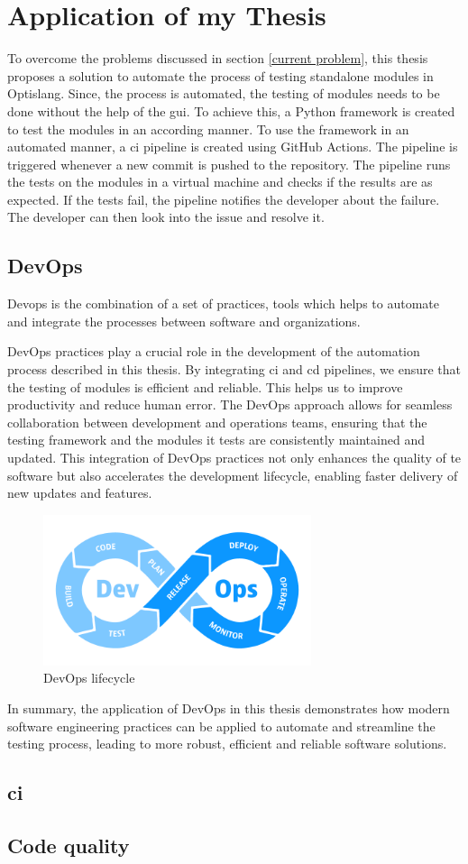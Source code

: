 \chapter{Application of my Thesis}

To overcome the problems discussed in section \ref{current problem}, this thesis proposes a solution to automate the process of testing standalone modules
in Optislang. Since, the process is automated, the testing of modules needs to be done without the help of the \acrshort{gui}. To achieve this, a Python
\cite{python} framework is created to test the modules in an according manner. To use the framework in an automated manner, a \acrshort{ci} pipeline is created using GitHub Actions. The pipeline 
is triggered whenever a new commit is pushed to the repository. The pipeline runs the tests on the modules in a virtual machine and checks if the results are as expected. If the tests 
fail, the pipeline notifies the developer about the failure. The developer can then look into the issue and resolve it.

\section{DevOps}
Devops is the combination of a set of practices, tools which helps to automate and integrate the processes between software and organizations.

DevOps practices play a crucial role in the development of the automation process described in this thesis. By integrating \acrfull{ci} and \acrfull{cd} pipelines, we ensure that the testing of 
modules is efficient and reliable. This helps us to improve productivity and reduce human error. The DevOps approach allows for seamless collaboration between development and operations teams, 
ensuring that the testing framework and the modules it tests are consistently maintained and updated. This integration of DevOps practices not only enhances the quality of te software but also 
accelerates the development lifecycle, enabling faster delivery of new updates and features.
\begin{figure}[!h]
    \centering
    \includegraphics[width=0.7\textwidth]{Images/devops_loop.png}
    \caption{DevOps lifecycle}
    \label{devops_lifecycle}
\end{figure}

In summary, the application of DevOps in this thesis demonstrates how modern software engineering practices can be applied to automate and streamline the testing process, leading to more robust,
efficient and reliable software solutions.

\section{\acrfull{ci}}

\section{Code quality}